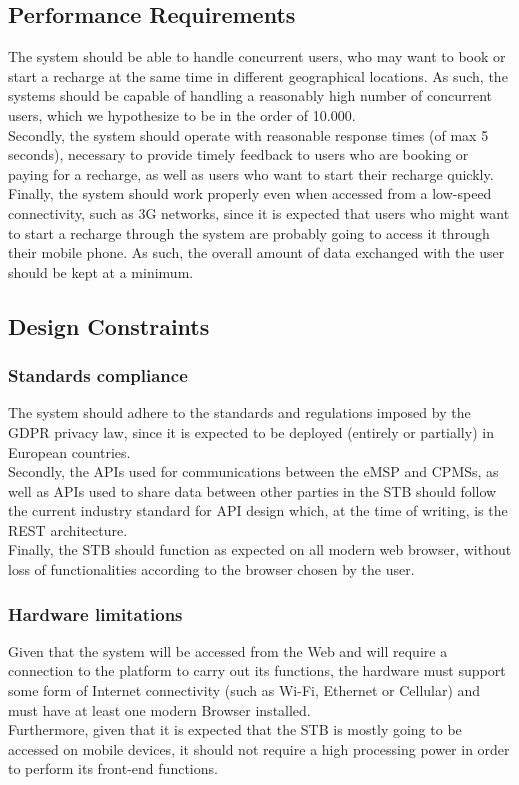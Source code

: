 \documentclass[11pt]{article}
\begin{document}
\subsection{Performance Requirements}
The system should be able to handle concurrent users, who may want to book or start a recharge at the same time in different geographical locations. As such, the systems should be capable of handling a reasonably high number of concurrent users, which we hypothesize to be in the order of 10.000. \\
Secondly, the system should operate with reasonable response times (of max 5 seconds), necessary to provide timely feedback to users who are booking or paying for a recharge, as well as users who want to start their recharge quickly. \\
Finally, the system should work properly even when accessed from a low-speed connectivity, such as 3G networks, since it is expected that users who might want to start a recharge through the system are probably going to access it through their mobile phone. As such, the overall amount of data exchanged with the user should be kept at a minimum. \\

\subsection{Design Constraints}
\subsubsection{Standards compliance}
The system should adhere to the standards and regulations imposed by the GDPR privacy law, since it is expected to be deployed (entirely or partially) in European countries. \\
Secondly, the APIs used for communications between the eMSP and CPMSs, as well as APIs used to share data between other parties in the STB should follow the current industry standard for API design which, at the time of writing, is the REST architecture. \\
Finally, the STB should function as expected on all modern web browser, without loss of functionalities according to the browser chosen by the user. 

\subsubsection{Hardware limitations}
Given that the system will be accessed from the Web and will require a connection to the platform to carry out its functions, the hardware must support some form of Internet connectivity (such as Wi-Fi, Ethernet or Cellular) and must have at least one modern Browser installed. \\
Furthermore, given that it is expected that the STB is mostly going to be accessed on mobile devices, it should not require a high processing power in order to perform its front-end functions. \\
\end{document}

